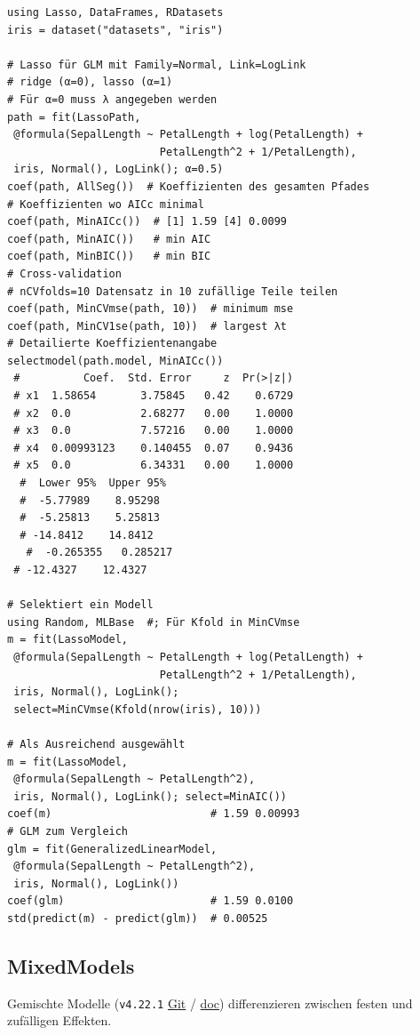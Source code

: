 \documentclass[10pt,twocolumn]{scrartcl}
\begin{document}
\begin{lstlisting}
using Lasso, DataFrames, RDatasets
iris = dataset("datasets", "iris")

# Lasso für GLM mit Family=Normal, Link=LogLink
# ridge (α=0), lasso (α=1)
# Für α=0 muss λ angegeben werden
path = fit(LassoPath,
 @formula(SepalLength ~ PetalLength + log(PetalLength) +
                        PetalLength^2 + 1/PetalLength),
 iris, Normal(), LogLink(); α=0.5)
coef(path, AllSeg())  # Koeffizienten des gesamten Pfades
# Koeffizienten wo AICc minimal
coef(path, MinAICc())  # [1] 1.59 [4] 0.0099
coef(path, MinAIC())   # min AIC
coef(path, MinBIC())   # min BIC
# Cross-validation
# nCVfolds=10 Datensatz in 10 zufällige Teile teilen
coef(path, MinCVmse(path, 10))  # minimum mse
coef(path, MinCV1se(path, 10))  # largest λt
# Detailierte Koeffizientenangabe
selectmodel(path.model, MinAICc())
 #          Coef.  Std. Error     z  Pr(>|z|)
 # x1  1.58654       3.75845   0.42    0.6729
 # x2  0.0           2.68277   0.00    1.0000
 # x3  0.0           7.57216   0.00    1.0000
 # x4  0.00993123    0.140455  0.07    0.9436
 # x5  0.0           6.34331   0.00    1.0000
  #  Lower 95%  Upper 95%
  #  -5.77989    8.95298
  #  -5.25813    5.25813
  # -14.8412    14.8412
   #  -0.265355   0.285217
 # -12.4327    12.4327

# Selektiert ein Modell
using Random, MLBase  #; Für Kfold in MinCVmse
m = fit(LassoModel,
 @formula(SepalLength ~ PetalLength + log(PetalLength) +
                        PetalLength^2 + 1/PetalLength),
 iris, Normal(), LogLink();
 select=MinCVmse(Kfold(nrow(iris), 10)))

# Als Ausreichend ausgewählt
m = fit(LassoModel,
 @formula(SepalLength ~ PetalLength^2),
 iris, Normal(), LogLink(); select=MinAIC())
coef(m)                         # 1.59 0.00993
# GLM zum Vergleich
glm = fit(GeneralizedLinearModel,
 @formula(SepalLength ~ PetalLength^2),
 iris, Normal(), LogLink())
coef(glm)                       # 1.59 0.0100
std(predict(m) - predict(glm))  # 0.00525
\end{lstlisting}

\subsection{MixedModels}

Gemischte Modelle (\lstinline|v4.22.1|
\href{https://github.com/JuliaStats/MixedModels.jl}{Git} /
\href{https://juliastats.org/MixedModels.jl/stable/}{doc}) differenzieren
zwischen festen und zufälligen Effekten.
\end{document}
